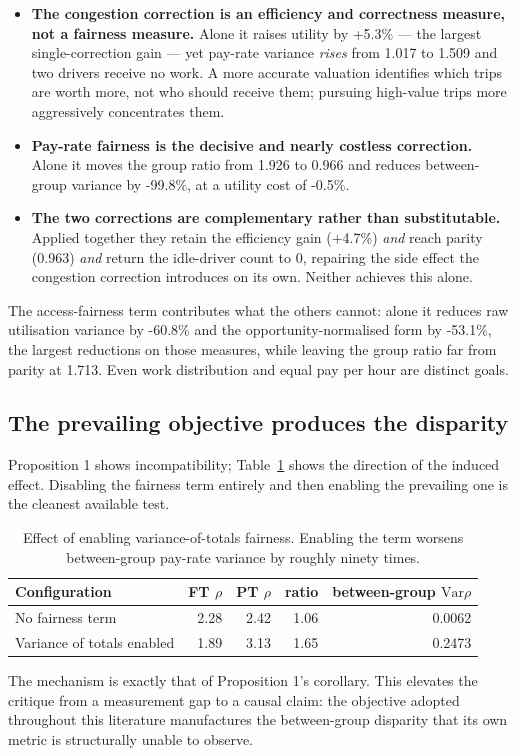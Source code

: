 \documentclass[10pt,twocolumn]{article}
\begin{document}
\begin{itemize}
\itemsep2pt
  \item \textbf{The congestion correction is an efficiency and correctness measure, not a fairness measure.} Alone it raises utility by +5.3\% --- the largest single-correction gain --- yet pay-rate variance \emph{rises} from 1.017 to 1.509 and two drivers receive no work. A more accurate valuation identifies which trips are worth more, not who should receive them; pursuing high-value trips more aggressively concentrates them.
  \item \textbf{Pay-rate fairness is the decisive and nearly costless correction.} Alone it moves the group ratio from 1.926 to 0.966 and reduces between-group variance by -99.8\%, at a utility cost of -0.5\%.
  \item \textbf{The two corrections are complementary rather than substitutable.} Applied together they retain the efficiency gain (+4.7\%) \emph{and} reach parity (0.963) \emph{and} return the idle-driver count to 0, repairing the side effect the congestion correction introduces on its own. Neither achieves this alone.
\end{itemize}
The access-fairness term contributes what the others cannot: alone it reduces raw utilisation variance by -60.8\% and the opportunity-normalised form by -53.1\%, the largest reductions on those measures, while leaving the group ratio far from parity at 1.713. Even work distribution and equal pay per hour are distinct goals.

\subsection{The prevailing objective produces the disparity}
Proposition 1 shows incompatibility; Table~\ref{tab:causes} shows the direction of the induced effect. Disabling the fairness term entirely and then enabling the prevailing one is the cleanest available test.

\begin{table}[t]
\centering
\caption{Effect of enabling variance-of-totals fairness. Enabling the term worsens between-group pay-rate variance by roughly ninety times.}
\label{tab:causes}
\small
\begin{tabular}{lrrrr}
\toprule
Configuration & FT \(\rho\) & PT \(\rho\) & ratio & between-group \(\mathrm{Var}\rho\) \\
\midrule
No fairness term & 2.28 & 2.42 & 1.06 & 0.0062 \\
Variance of totals enabled & 1.89 & 3.13 & 1.65 & 0.2473 \\
\bottomrule
\end{tabular}
\end{table}
The mechanism is exactly that of Proposition 1's corollary. This elevates the critique from a measurement gap to a causal claim: the objective adopted throughout this literature manufactures the between-group disparity that its own metric is structurally unable to observe.
\end{document}

